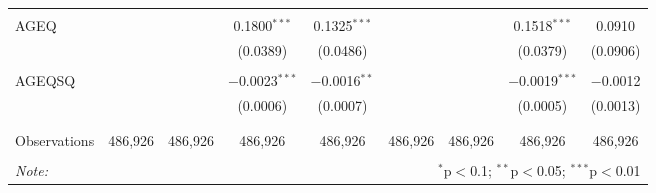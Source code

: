 \begin{table}[!htbp]
\begin{tabular}{@{\extracolsep{5pt}}lcccccccc}
  & & & & & & & & \\ 
 AGEQ &  &  & 0.1800$^{***}$ & 0.1325$^{***}$ &  &  & 0.1518$^{***}$ & 0.0910 \\ 
  &  &  & (0.0389) & (0.0486) &  &  & (0.0379) & (0.0906) \\ 
  & & & & & & & & \\ 
 AGEQSQ &  &  & $-$0.0023$^{***}$ & $-$0.0016$^{**}$ &  &  & $-$0.0019$^{***}$ & $-$0.0012 \\ 
  &  &  & (0.0006) & (0.0007) &  &  & (0.0005) & (0.0013) \\ 
  & & & & & & & & \\ 
\hline \\[-1.8ex] 
Observations & 486,926 & 486,926 & 486,926 & 486,926 & 486,926 & 486,926 & 486,926 & 486,926 \\ 
\hline 
\hline \\[-1.8ex] 
\textit{Note:}  & \multicolumn{8}{r}{$^{*}$p$<$0.1; $^{**}$p$<$0.05; $^{***}$p$<$0.01} \\ 
\end{tabular} 
\end{table} 
